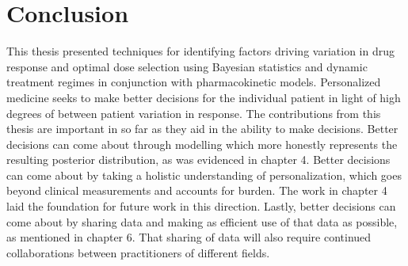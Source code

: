 \section{Conclusion}

This thesis presented techniques for identifying factors driving variation in drug response and optimal dose selection using Bayesian statistics and dynamic treatment regimes in conjunction with pharmacokinetic models.  Personalized medicine seeks to make better decisions for the individual patient in light of high degrees of between patient variation in response.  The contributions from this thesis are important in so far as they aid in the ability to make decisions.  Better decisions can come about through modelling which more honestly represents the resulting posterior distribution, as was evidenced in chapter 4.  Better decisions can come about by taking a holistic understanding of personalization, which goes beyond clinical measurements and accounts for burden.  The work in chapter 4 laid the foundation for future work in this direction.  Lastly, better decisions can come about by sharing data and making as efficient use of that data as possible, as mentioned in chapter 6. That sharing of data will also require continued collaborations between practitioners of different fields.